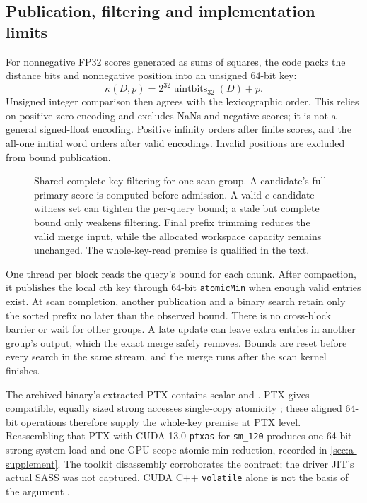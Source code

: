 \subsection{Publication, filtering and implementation limits}

For nonnegative FP32 scores generated as sums of squares, the code packs
the distance bits and nonnegative position into an unsigned 64-bit key:
\begin{equation}
 \kappa(D,p)=2^{32}\operatorname{uintbits}_{32}(D)+p.
 \label{eq:5-packed-key}
\end{equation}
Unsigned integer comparison then agrees with the lexicographic order.
This relies on positive-zero encoding and excludes NaNs and negative
scores; it is not a general signed-float encoding. Positive infinity
orders after finite scores, and the all-one initial word orders after
valid encodings. Invalid positions are excluded from bound publication.

\begin{figure}[tbp]
\centering

\caption[Shared complete-key filtering]{Shared complete-key filtering for one scan group. A candidate's
full primary score is computed before admission. A valid $c$-candidate
witness set can tighten the per-query bound; a stale but complete bound
only weakens filtering. Final prefix trimming reduces the valid merge
input, while the allocated workspace capacity remains unchanged.
The whole-key-read premise is qualified in the text.}
\label{fig:5-shared-bound}
\end{figure}

One thread per block reads the query's bound for each chunk. After
compaction, it publishes the local $c$th key through 64-bit
\texttt{atomicMin} when enough valid entries exist. At scan completion,
another publication and a binary search retain only the sorted prefix
no later than the observed bound. There is no cross-block barrier or
wait for other groups. A late update can leave extra entries in another
group's output, which the exact merge safely removes. Bounds are reset
before every search in the same stream, and the merge runs after the
scan kernel finishes.

The archived binary's extracted PTX contains scalar
 and .
PTX gives compatible, equally sized strong accesses single-copy atomicity
\cite{ptx_isa}; these aligned 64-bit operations therefore supply the
whole-key premise at PTX level. Reassembling that PTX with CUDA 13.0
\texttt{ptxas} for \texttt{sm\_120} produces one 64-bit strong system load
and one GPU-scope atomic-min reduction, recorded in
\cref{sec:a-supplement}. The toolkit disassembly corroborates the contract;
the driver JIT's actual SASS was not captured. CUDA C++ \texttt{volatile}
alone is not the basis of the argument \cite{cuda_programming_guide}.

